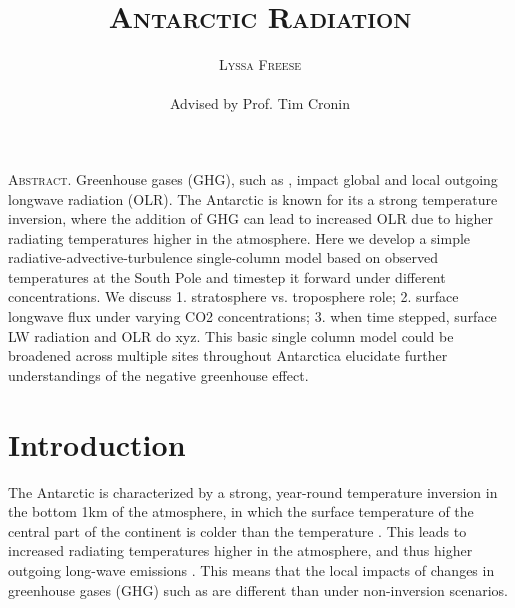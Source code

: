\documentclass[12]{article}
\title{{\textsc{\Large Antarctic Radiation}}}
\author{\textsc{Lyssa Freese}
\\\\
Advised by Prof. Tim Cronin}
\begin{document}
\maketitle
\thispagestyle{empty}

\setlength{\leftskip}{1.1cm}
\setlength{\rightskip}{1.1cm}


\bigskip
\bigskip

{\textsc{Abstract.} }
Greenhouse gases (GHG), such as , impact global and local outgoing longwave radiation (OLR). The Antarctic is known for its a strong temperature inversion, where the addition of GHG can lead to increased OLR due to higher radiating temperatures higher in the atmosphere. Here we develop a simple radiative-advective-turbulence single-column model based on observed temperatures at the South Pole and timestep it forward under different  concentrations. We discuss 1. stratosphere vs. troposphere role; 2. surface longwave flux under varying CO2 concentrations; 3. when time stepped, surface LW radiation and OLR do xyz. This basic single column model could be broadened across multiple sites throughout Antarctica elucidate further understandings of the negative greenhouse effect.
\bigskip
\bigskip 
\clearpage
\setcounter{page}{1}

\setlength{\leftskip}{0cm}
\setlength{\rightskip}{0cm}

\section{Introduction}
The Antarctic is characterized by a strong, year-round temperature inversion in the bottom 1km of the atmosphere, in which the surface temperature of the central part of the continent is colder than the temperature \citep{hudson_look_2005}. This leads to increased radiating temperatures higher in the atmosphere, and thus higher outgoing long-wave emissions \citep{schmithusen_how_2015}. This means that the local impacts of changes in greenhouse gases (GHG) such as  are different than under non-inversion scenarios.
\end{document}
